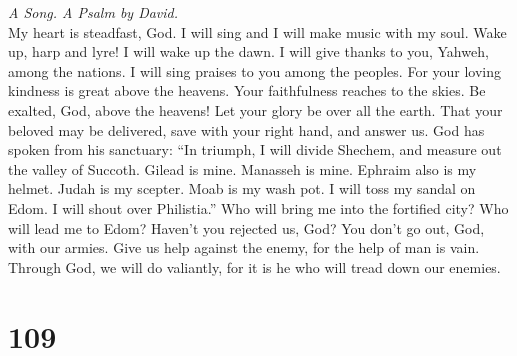 \emph{A Song. A Psalm by David.}\\
 My heart is steadfast, God. I will sing and I will make
music with my soul.  Wake up, harp and lyre! I will wake
up the dawn.  I will give thanks to you, Yahweh, among the
nations. I will sing praises to you among the peoples. 
For your loving kindness is great above the heavens. Your faithfulness
reaches to the skies.  Be exalted, God, above the heavens!
Let your glory be over all the earth.  That your beloved
may be delivered, save with your right hand, and answer us.
 God has spoken from his sanctuary: ``In triumph, I will
divide Shechem, and measure out the valley of Succoth. 
Gilead is mine. Manasseh is mine. Ephraim also is my helmet. Judah is my
scepter.  Moab is my wash pot. I will toss my sandal on
Edom. I will shout over Philistia.''  Who will bring me
into the fortified city? Who will lead me to Edom? 
Haven't you rejected us, God? You don't go out, God, with our armies.
 Give us help against the enemy, for the help of man is
vain.  Through God, we will do valiantly, for it is he
who will tread down our enemies.

\hypertarget{section-108}{%
\section{109}\label{section-108}}

